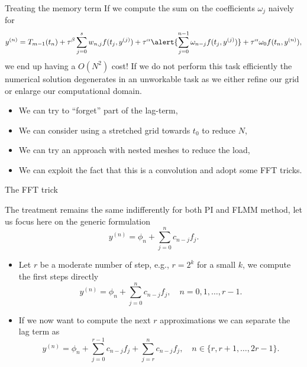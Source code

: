 \documentclass[aspectratio=169,xcolor=dvipsnames]{beamer}
\begin{document}
\begin{frame}{Treating the memory term}
If we compute the sum on the coefficients $\omega_{j}$ naively for
\[
y^{(n)} = T_{m-1}(t_n) + \tau^\beta \sum_{j=0}^{s} w_{n,j} f(t_j,y^{(j)}) + \tau^\alpha \alert{\sum_{j=0}^{n-1} \omega_{n-j} f(t_j,y^{(j)})} + \tau^\alpha \omega_{0}f(t_n,y^{(n)}),
\]
we end up having a $O(N^2)$ cost! If we do not perform this task efficiently the numerical solution degenerates in an unworkable task as we either refine our
grid or enlarge our computational domain.

\begin{itemize}
	\item[\faDoorClosed]<2-> We can try to ``forget'' part of the lag-term,
	\item[\faDoorClosed]<3-> We can consider using a stretched grid towards $t_0$ to reduce $N$,
	\item[\faDoorClosed]<4-> We can try an approach with nested meshes to reduce the load,
	\item[\faDoorClosed]<5-> We can exploit the fact that this is a convolution and adopt some FFT tricks.
\end{itemize}

\end{frame}

\begin{frame}{The FFT trick~\parencite{HairerFFTtrick}}

The treatment remains the same indifferently for both PI and FLMM method, let us focus here on the generic formulation
\[
y^{(n)} = \phi_n + \sum_{j=0}^{n} c_{n-j} f_j.
\]

\begin{itemize}
	\item<2-> Let $r$ be a moderate number of step, e.g., $r = 2^k$ for a small $k$, we compute the first steps directly
	\[
	y^{(n)} = \phi_n + \sum_{j=0}^{n} c_{n-j} f_j, \quad n = 0,1,\ldots,r-1.
	\]
	\item<3-> If we now want to compute the next $r$ approximations we can separate the lag term as
	\[
	y^{(n)} = \phi_n + \sum_{j=0}^{r-1} c_{n-j} f_j + \sum_{j=r}^{n} c_{n-j} f_j, \quad n \in \{r,r+1,\ldots,2r-1\}.
	\]
\end{itemize}
\end{frame}
\end{document}
